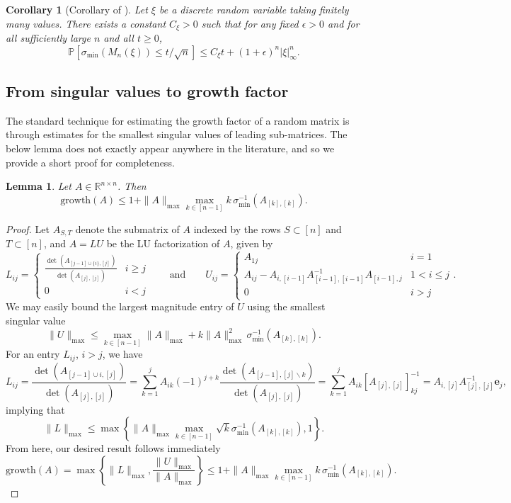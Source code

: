 \documentclass[reqno]{amsart}
\numberwithin{equation}{section}
\newtheorem{lemma}[theorem]{Lemma}
\newtheorem{corollary}[theorem]{Corollary}
\begin{document}
\begin{corollary}[Corollary of {\cite[Theorem 1.4]{jain2021singularity}}]\label{cor:jss} Let $\xi$ be a discrete random variable taking finitely many values. There exists a constant $C_\xi > 0$ such that for any fixed $\epsilon > 0$ and for all sufficiently large $n$ and all $t \geq 0$,
\[
\mathbb{P}[\sigma_{\min}(M_n(\xi)) \leq t/\sqrt{n}] \leq C_\xi t + (1+\epsilon)^n |\xi|_\infty^n.
\]
\end{corollary}


\subsection{From singular values to growth factor}

The standard technique for estimating the growth factor of a random matrix is through estimates for the smallest singular values of leading sub-matrices. The below lemma does not exactly appear anywhere in the literature, and so we provide a short proof for completeness.

\begin{lemma}\label{lm:growth}
Let $A \in \mathbb{R}^{n \times n}$. Then
\[\mathrm{growth}(A) \le 1 + \|A\|_{\max} \max_{k \in [n-1]} k \, \sigma_{\min}^{-1}(A_{[k],[k]}).\]
\end{lemma}
\begin{proof}
Let $A_{S,T}$ denote the submatrix of $A$ indexed by the rows $S \subset [n]$ and $T \subset [n]$, and $A = LU$ be the LU factorization of $A$, given by
\[L_{ij} = \begin{cases} 
\displaystyle{\frac{\det(A_{[j-1]\cup\{i\},[j]})}{\det(A_{[j],[j]})}} & i \ge j  \\
0 & i<j 
\end{cases} \qquad \text{and} \qquad U_{ij} = \begin{cases} 
A_{1j} & i = 1 \\
 A_{ij} - A_{i,[i-1]} A_{[i-1],[i-1]}^{-1} A_{[i-1],j} & 1<i \le j \\
0 & i >j
\end{cases}.\]
We may easily bound the largest magnitude entry of $U$ using the smallest singular value
\[\|U\|_{\max} \le \max_{k \in [n-1]} \|A\|_{\max} + k \|A\|_{\max}^2 \, \sigma_{\min}^{-1}(A_{[k],[k]}). \]
For an entry $L_{ij}$, $i>j$, we have
\[L_{ij} = \frac{\det(A_{[j-1]\cup i,[j]})}{\det(A_{[j],[j]})} = \sum_{k =1 }^j A_{ik} (-1)^{j+k} \frac{\det(A_{[j-1],[j]\backslash k})}{\det(A_{[j],[j]})} = \sum_{k=1}^j A_{ik} [A_{[j],[j]}]^{-1}_{kj} = A_{i,[j]} A_{[j],[j]}^{-1} \bm{e}_j,\]
implying that
\[\|L\|_{\max} \le \max \left\{ \|A\|_{\max} \max_{k \in [n-1]} \sqrt{k} \sigma_{\min}^{-1}(A_{[k],[k]}),1 \right\}. \]
From here, our desired result follows immediately
\[\mathrm{growth}(A) = \max\left\{ \|L\|_{\max}, \frac{\|U\|_{\max}}{\|A\|_{\max}} \right\} \le 1 + \|A\|_{\max} \max_{k \in [n-1]} k \, \sigma_{\min}^{-1}(A_{[k],[k]}). \]
\end{proof}
\end{document}
